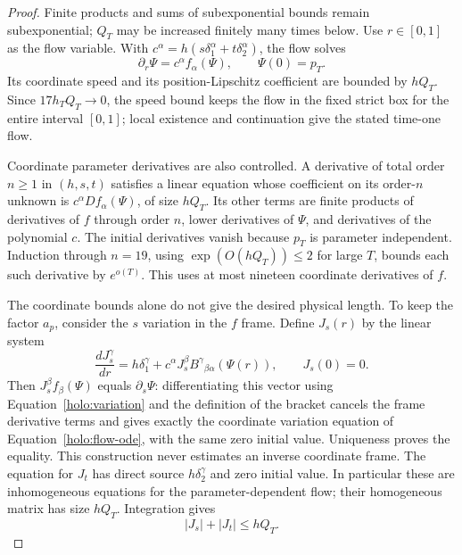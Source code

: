 \begin{proof}
Finite products and sums of subexponential bounds remain
subexponential; $Q_T$ may be increased finitely many times below.
Use $r\in[0,1]$ as the flow variable.  With
$c^\alpha=h(s\delta_1^\alpha+t\delta_2^\alpha)$, the flow solves
\begin{equation}\label{holo:flow-ode}
 \partial_r\Psi=c^\alpha f_\alpha(\Psi),\qquad \Psi(0)=p_T.
\end{equation}
Its coordinate speed and its position-Lipschitz coefficient are
bounded by $hQ_T$.  Since $17h_TQ_T\to0$, the speed bound keeps
the flow in the fixed strict box for the entire interval $[0,1]$;
local existence and continuation give the stated time-one flow.

Coordinate parameter derivatives are also controlled.  A derivative
of total order $n\geq1$ in $(h,s,t)$ satisfies a linear equation
whose coefficient on its order-$n$ unknown is
$c^\alpha Df_\alpha(\Psi)$, of size $hQ_T$.  Its other terms are
finite products of derivatives of $f$ through order $n$, lower
derivatives of $\Psi$, and derivatives of the polynomial $c$.
The initial derivatives vanish because $p_T$ is parameter
independent.  Induction through $n=19$, using
$\exp(O(hQ_T))\leq2$ for large $T$, bounds each such derivative
by $e^{o(T)}$.  This uses at most nineteen coordinate derivatives
of $f$.

The coordinate bounds alone do not give the desired physical
length.  To keep the factor $a_p$, consider the $s$ variation in
the $f$ frame.  Define $J_s(r)$ by the linear system
\begin{equation}\label{holo:variation}
 \frac{dJ_s^\gamma}{dr}
   =h\delta_1^\gamma
       +c^\alpha J_s^\beta
                    B^\gamma{}_{\beta\alpha}(\Psi(r)),
       \qquad J_s(0)=0.
\end{equation}
Then $J_s^\beta f_\beta(\Psi)$ equals $\partial_s\Psi$:
differentiating this vector using Equation~\eqref{holo:variation}
and the definition of the bracket cancels the frame derivative
terms and gives exactly the coordinate variation equation of
Equation~\eqref{holo:flow-ode}, with the same zero initial value.
Uniqueness proves the equality.  This construction never estimates
an inverse coordinate frame.  The equation for $J_t$ has direct
source $h\delta_2^\gamma$ and zero initial value.  In particular
these are inhomogeneous equations for the parameter-dependent
flow; their homogeneous matrix has size $hQ_T$.  Integration gives
\begin{equation}\label{holo:variation-bound}
 |J_s|+|J_t|\leq hQ_T.
\end{equation}


\end{proof}
